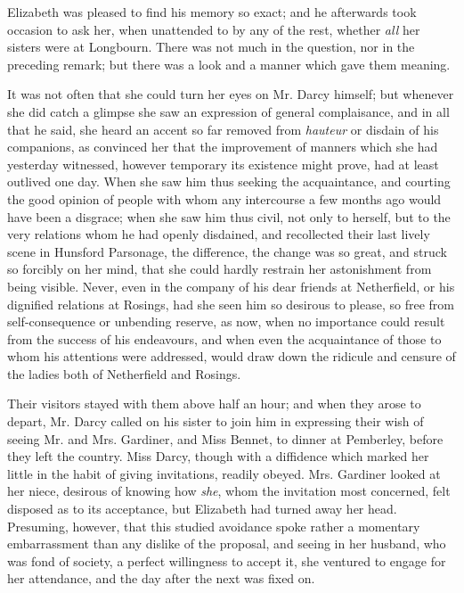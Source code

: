 \documentclass[12pt]{book}
\begin{document}
Elizabeth was pleased to find his memory so exact; and he afterwards took occasion to ask her, when unattended to by any of the rest, whether \textit{all} her sisters were at Longbourn. There was not much in the question, nor in the preceding remark; but there was a look and a manner which gave them meaning.

It was not often that she could turn her eyes on Mr. Darcy himself; but whenever she did catch a glimpse she saw an expression of general complaisance, and in all that he said, she heard an accent so far removed from \textit{hauteur} or disdain of his companions, as convinced her that the improvement of manners which she had yesterday witnessed, however temporary its existence might prove, had at least outlived one day. When she saw him thus seeking the acquaintance, and courting the good opinion of people with whom any intercourse a few months ago would have been a disgrace; when she saw him thus civil, not only to herself, but to the very relations whom he had openly disdained, and recollected their last lively scene in Hunsford Parsonage, the difference, the change was so great, and struck so forcibly on her mind, that she could hardly restrain her astonishment from being visible. Never, even in the company of his dear friends at Netherfield, or his dignified relations at Rosings, had she seen him so desirous to please, so free from self-consequence or unbending reserve, as now, when no importance could result from the success of his endeavours, and when even the acquaintance of those to whom his attentions were addressed, would draw down the ridicule and censure of the ladies both of Netherfield and Rosings.

Their visitors stayed with them above half an hour; and when they arose to depart, Mr. Darcy called on his sister to join him in expressing their wish of seeing Mr. and Mrs. Gardiner, and Miss Bennet, to dinner at Pemberley, before they left the country. Miss Darcy, though with a diffidence which marked her little in the habit of giving invitations, readily obeyed. Mrs. Gardiner looked at her niece, desirous of knowing how \textit{she}, whom the invitation most concerned, felt disposed as to its acceptance, but Elizabeth had turned away her head. Presuming, however, that this studied avoidance spoke rather a momentary embarrassment than any dislike of the proposal, and seeing in her husband, who was fond of society, a perfect willingness to accept it, she ventured to engage for her attendance, and the day after the next was fixed on.
\end{document}
